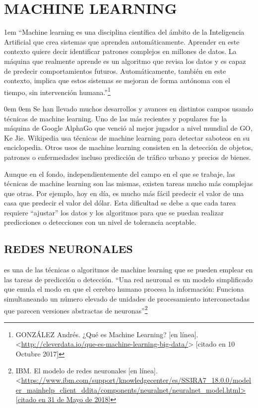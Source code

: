     \section{MACHINE LEARNING}
    
    \leftskip1em
    \rightskip\leftskip
    {\footnotesize \hspace{\parindent}
    “Machine learning es una disciplina científica del ámbito de la Inteligencia Artificial que crea sistemas que aprenden automáticamente. Aprender en este contexto quiere decir identificar patrones complejos en millones de datos. La máquina que realmente aprende es un algoritmo que revisa los datos y es capaz de predecir comportamientos futuros. Automáticamente, también en este contexto, implica que estos sistemas se mejoran de forma autónoma con el tiempo, sin intervención humana.”\footnote[10]{GONZÁLEZ  Andrés. ¿Qué es Machine Learning? [en línea]. <\url{http://cleverdata.io/que-es-machine-learning-big-data/}> [citado en 10 Octubre 2017]}}

    \leftskip0em
    \rightskip0em
    Se han llevado muchos desarrollos y avances en distintos campos usando técnicas de machine learning. Uno de las más recientes y populares fue la máquina de Google AlphaGo que venció al mejor jugador a nivel mundial de GO, Ke Jie. Wikipedia usa técnicas de machine learning para detectar saboteos en su enciclopedia. Otros usos de machine learning consisten en la detección de objetos, patrones o enfermedades incluso predicción de tráfico urbano y precios de bienes.
    
    Aunque en el fondo, independientemente del campo en el que se trabaje, las técnicas de machine learning son las mismas, existen tareas mucho más complejas que otras. Por ejemplo, hoy en día, es mucho más fácil predecir el valor de una casa que predecir el valor del dólar. Esta dificultad se debe a que cada tarea requiere “ajustar” los datos y los algoritmos para que se puedan realizar predicciones o detecciones con un nivel de tolerancia aceptable.
    
    \subsection{REDES NEURONALES} es una de las técnicas o algoritmos de machine learning que se pueden emplear en las tareas de predicción o detección. “Una red neuronal es un modelo simplificado que emula el modo en que el cerebro humano procesa la información: Funciona simultaneando un número elevado de unidades de procesamiento interconectadas que parecen versiones abstractas de neuronas”\footnote[11]{IBM. El modelo de redes neuronales [en línea]. <\url{https://www.ibm.com/support/knowledgecenter/es/SS3RA7_18.0.0/modeler_mainhelp_client_ddita/components/neuralnet/neuralnet_model.html> [citado en 31 de Mayo de 2018]} }
    
